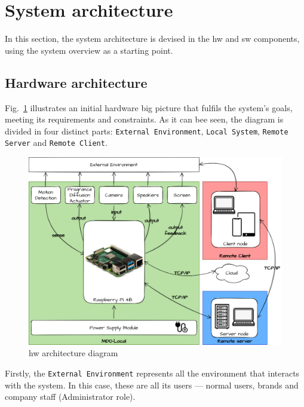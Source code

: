 %
\section{System architecture}
\label{sec:system-architecture}
In this section, the system architecture is devised in the \gls{hw} and \gls{sw} components, using the system overview as a starting point. 

\subsection{Hardware architecture}
\label{sec:hardw-arch}
%
Fig.~\ref{fig:hw-arch} illustrates an initial hardware big picture that fulfils
the system's goals, meeting its requirements and constraints.
As it can bee seen, the diagram is divided in four distinct parts:
\texttt{External Environment}, \texttt{Local System}, \texttt{Remote Server} and
\texttt{Remote Client}.
%
\begin{figure}[htb!]
\centering
    \includegraphics[width=0.8\columnwidth]{./img/hw-arch.png}
  \caption{\gls{hw} architecture diagram}%
\label{fig:hw-arch}
\end{figure}
%

Firstly, the \texttt{External Environment} represents all the environment that
interacts with the system. In this case, these are all its users --- normal
users, brands and company staff (Administrator role).

